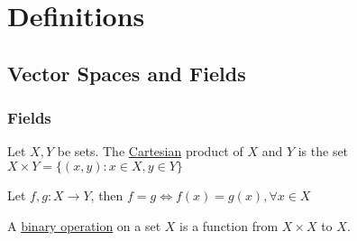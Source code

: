 \chapter{Definitions}
\section{Vector Spaces and Fields}
\subsection{Fields}
\begin{mydef}
\normalfont Let \(X,Y\) be sets. The \underline{Cartesian} product of \(X\) and \(Y\) is the set \(X \times Y = \{(x, y) : x \in X, y \in Y\}\)
\end{mydef}

\begin{mydef}
\normalfont Let \(f, g : X \to Y\), then \(f = g \Leftrightarrow f(x) = g(x), \forall x \in X\)
\end{mydef}

\begin{mydef}
\normalfont A \underline{binary operation} on a set \(X\) is a function from \(X \times X\) to \(X\).
\end{mydef}


